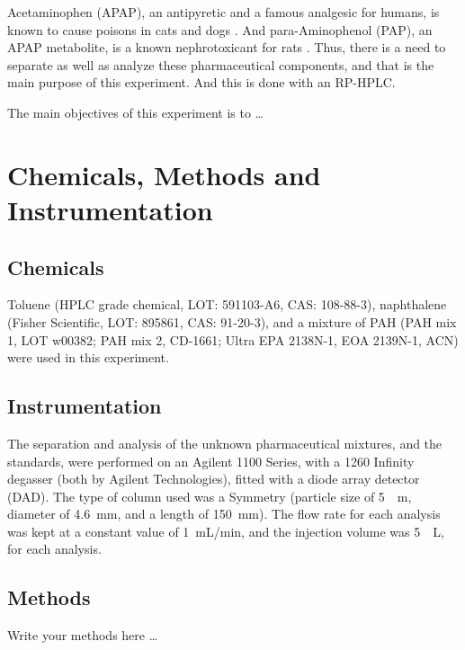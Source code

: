 \documentclass[a4paper, 12pt]{article}
\begin{document}
Acetaminophen (APAP), an antipyretic and a famous analgesic for humans, is known to cause poisons in cats and dogs \cite{dogs-cats}. And para-Aminophenol (PAP), an APAP metabolite, is a known nephrotoxicant for rats \cite{rats}. Thus, there is a need to separate as well as analyze these pharmaceutical components, and that is the main purpose of this experiment. And this is done with an RP-HPLC.

The main objectives of this experiment is to \ldots{}


\section{Chemicals, Methods and Instrumentation}

\subsection{Chemicals}
Toluene (HPLC grade chemical, LOT: 591103-A6, CAS: 108-88-3), naphthalene (Fisher Scientific, LOT: 895861, CAS: 91-20-3), and a mixture of PAH (PAH mix 1, LOT w00382; PAH mix 2, CD-1661; Ultra EPA 2138N-1, EOA 2139N-1, ACN) were used in this experiment.

\subsection{Instrumentation}
The separation and analysis of the unknown pharmaceutical mixtures, and the standards, were performed on an Agilent 1100 Series, with a 1260 Infinity degasser (both by Agilent Technologies), fitted with a diode array detector (DAD). The type of column used was a Symmetry\textregistered{}  (particle size of \SI{5}{\mu{}m}, diameter of \SI{4.6}{mm}, and a length of \SI{150}{mm}). The flow rate for each analysis was kept at a constant value of \SI{1}{mL/min}, and the injection volume was \SI{5}{\mu{}L}, for each analysis.

\subsection{Methods}
Write your methods here \dots

\end{document}
